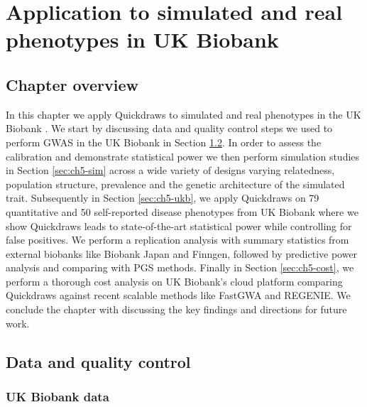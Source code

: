\chapter{\label{ch:5-qd-result}Application to simulated and real phenotypes in UK Biobank}

\minitoc

\section{Chapter overview}

In this chapter we apply Quickdraws to simulated and real phenotypes in the UK Biobank \cite{bycroft2018uk}. We start by discussing data and quality control steps we used to perform GWAS in the UK Biobank in Section \ref{sec:ch5-data}. In order to assess the calibration and demonstrate statistical power we then perform simulation studies in Section \ref{sec:ch5-sim} across a wide variety of designs varying relatedness, population structure, prevalence and the genetic architecture of the simulated trait. Subsequently in Section \ref{sec:ch5-ukb}, we apply Quickdraws on 79 quantitative and 50 self-reported disease phenotypes from UK Biobank where we show Quickdraws leads to state-of-the-art statistical power while controlling for false positives. We perform a replication analysis with summary statistics from external biobanks like Biobank Japan and Finngen, followed by predictive power analysis and comparing with PGS methods. Finally in Section \ref{sec:ch5-cost}, we perform a thorough cost analysis on UK Biobank's cloud platform comparing Quickdraws against recent scalable methods like FastGWA and REGENIE. We conclude the chapter with discussing the key findings and directions for future work.

\section{Data and quality control}
\label{sec:ch5-data}

\subsection{UK Biobank data}

